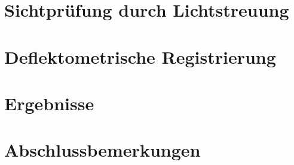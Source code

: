 \documentclass[ngerman,11pt,twocolumn,a4paper]{article}
\begin{document}
	\section{Sichtprüfung durch Lichtstreuung} \label{sec:sichtpruefungDurchLichtstreuung}
	
	\section{Deflektometrische Registrierung} \label{sec:deflektometrischeRegistrierung}
	
	\section{Ergebnisse} \label{sec:ergebnisse}
	
	\section{Abschlussbemerkungen} \label{sec:abschlussbemerkungen}
	
	\printbibliography[title = Quellenverzeichnis]
\end{document}

